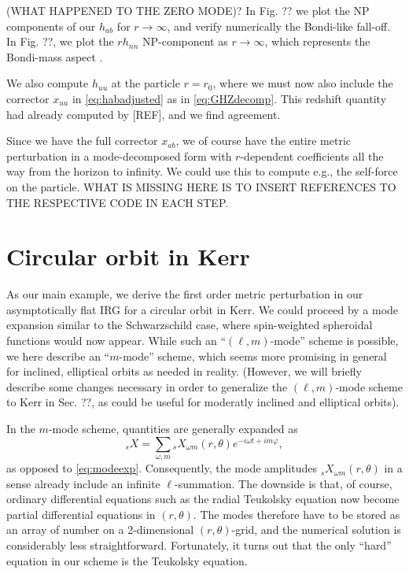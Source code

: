 \documentclass[%
reprint,
 prd,
superscriptaddress,
nofootinbib,
aps,
dvipsnames
]{revtex4-2}
\begin{document}
(WHAT HAPPENED TO THE ZERO MODE)? In Fig. ?? we plot 
the NP components of our $h_{ab}$ for $r \to \infty$, 
and verify numerically the Bondi-like fall-off. In Fig. ??, we plot the $rh_{nn}$ NP-component as $r \to \infty$, which represents the Bondi-mass aspect \cite[App. D]{Hollands:2024iqp}.

We also compute $h_{uu}$ at the particle $r=r_0$, where we must now also include the corrector $x_{uu}$ in \eqref{eq:habadjusted} as in \eqref{eq:GHZdecomp}.
This redshift quantity had already computed by [REF], and we find agreement. 

Since we have the full corrector $x_{ab}$, we of course have the entire metric perturbation in a mode-decomposed form with $r$-dependent coefficients all the way from the horizon to infinity. We could use this to compute e.g., the self-force on the particle. 
WHAT IS MISSING HERE IS TO INSERT REFERENCES TO THE RESPECTIVE CODE IN EACH STEP.

\section{Circular orbit in Kerr}
\label{sec:kerr}

As our main example, we derive the first order metric perturbation in our asymptotically flat IRG for a circular orbit in Kerr. We could proceed by a mode expansion similar to the Schwarzschild case, where spin-weighted spheroidal functions would now appear. While such an ``$(\ell,m)$-mode'' scheme is possible, we here describe an ``$m$-mode'' scheme, which seems more promising in general for inclined, elliptical orbits as needed in reality. (However, we will briefly describe 
some changes necessary in order to generalize the $(\ell,m)$-mode scheme to Kerr in Sec. ??, as could be useful for moderatly inclined and elliptical orbits). 

In the $m$-mode scheme, quantities are generally expanded as 
\begin{equation}
    {}_s X = \sum_{\omega,m} {}_s X_{\omega m}(r,\theta) e^{-i\omega t+im\varphi}, 
\end{equation}
as opposed to \eqref{eq:modeexp}. Consequently, the mode amplitudes ${}_s X_{\omega m}(r,\theta)$ in a sense already include an infinite $\ell$-summation. The downside is that, of course, ordinary differential equations such as the radial Teukolsky equation now become partial differential equations in $(r,\theta)$. The modes therefore have to be stored as an array of number on a 2-dimensional $(r,\theta)$-grid, and the numerical solution is considerably less straightforward. Fortunately, it turns out that the only ``hard'' equation in our scheme is the Teukolsky equation.
\end{document}
